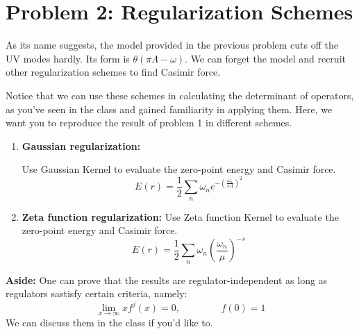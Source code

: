 \documentclass[11pt]{article}
\begin{document}
\newpage
	\section*{Problem 2: Regularization Schemes}

\begin{problem}
	As its name suggests, the model provided in the previous problem cuts off the UV modes hardly. Its form is $\theta(\pi \Lambda - \omega)$. We can forget the model and recruit other regularization schemes to find Casimir force. 
	
	\noindent
	Notice that we can use these schemes in calculating the determinant of operators, as you've seen in the class and gained familiarity in applying them. Here, we want you to reproduce the result of problem 1 in different schemes.
	

	
\end{problem}
\begin{enumerate}
	\item
	\begin{problem}{\points{-}}
		\textbf{Gaussian regularization:}
		
		\noindent
		Use Gaussian Kernel to evaluate the zero-point energy and Casimir force.
		\[
		E(r) = \frac12 \sum_n \omega_n e^{-(\frac{\omega_n}{\pi\Lambda})^2}
		\]
	\end{problem}
	\item
	\begin{problem}{\points{-}}
		\textbf{Zeta function regularization:}
		\noindent
		Use Zeta function Kernel to evaluate the zero-point energy and Casimir force.
		\[
		E(r) = \frac12 \sum_n \omega_n (\frac{\omega_n}{\mu})^{-s}
		\]
	\end{problem}

\end{enumerate}

	\textbf{Aside:} One can prove that the results are regulator-independent as long as regulators sastisfy certain criteria, namely:
	\[
	\lim_{x \to \infty } xf^j(x) =0, \;\;\;\;\;\;\;\;\;\;\;\;\;\;\; f(0) =1
	\]
	We can discuss them in the class if you'd like to.
\newpage
\end{document}
